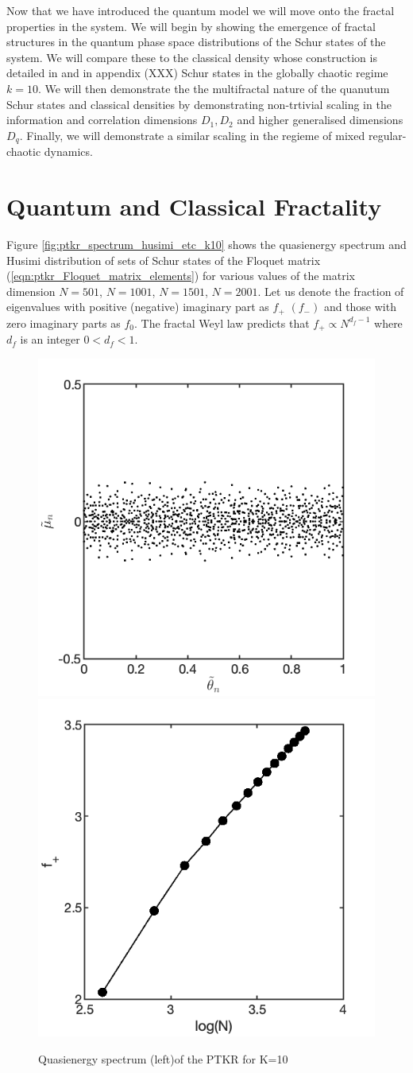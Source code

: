 \documentclass{iopart}
\begin{document}
	Now that we have introduced the quantum model we will move onto the fractal properties in the system. We will begin by showing the emergence of fractal structures in the quantum phase space distributions of the Schur states of the system. We will compare these to the classical density whose construction is detailed in \cite{me} and in appendix (XXX)  Schur states in the globally chaotic regime $k=10$. We will then demonstrate the the multifractal nature of the quanutum Schur states and classical densities by demonstrating non-trtivial scaling in the information and correlation dimensions $D_1,D_2$ and higher generalised dimensions $D_q$. Finally, we will demonstrate a similar scaling in the regieme of mixed regular-chaotic dynamics. 

	\section{Quantum and Classical Fractality }
	
	Figure \ref{fig:ptkr_spectrum_husimi_etc_k10} shows the quasienergy spectrum and Husimi distribution of sets of Schur states of the Floquet matrix (\ref{eqn:ptkr_Floquet_matrix_elements}) for various values of the matrix dimension $N=501$, $N=1001$, $N=1501$, $N=2001$. Let us denote the fraction of eigenvalues with positive (negative) imaginary part as $f_{+}$ $(f_{-})$ and those with zero imaginary parts as $f_{0}$. The fractal Weyl law predicts that $f_{+}\propto N^{d_f-1}$ where $d_f$ is an integer $0<d_f<1$. 
	
		\begin{figure}[h!]
		\centering	
		{\includegraphics[width=0.45\columnwidth]{spec_k10_gp001_N2001_2x3}}
		{\includegraphics[width=0.45\columnwidth]{fweyl_log_plot_k10_gp001_2x3}}

		\caption{Quasienergy spectrum (left)of the PTKR for K=10}
		\label{fig:ptkr_spec_k10}
	\end{figure}
\end{document}
